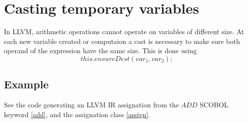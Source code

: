 \section{Casting temporary variables}

In LLVM, arithmetic operations cannot operate on variables of different size. At each new variable created or computaion a cast is necessary to make sure both operand of the expression have the same size. This is done using 
$$this.ensureDest(var_1, var_2 );$$

\subsection{Example}
See the code generating an LLVM IR assignation from the $ADD$ SCOBOL keyword \ref{add}, and the assignation class \ref{assign}.



